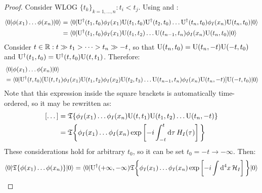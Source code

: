 \begin{proofbox}
  \begin{proof}
    Consider WLOG $ \{t_k\}_{k = 1,\dots,n} : t_i < t_j $. Using  and :
    \begin{equation*}
      \begin{split}
        \braket{0 | \phi(x_1) \dots \phi(x_n) | 0}
        & = \braket{0 | \mathrm{U}^\dagger(t_1,t_0) \phi_I(x_1) \mathrm{U}(t_1,t_0) \mathrm{U}^\dagger(t_2,t_0) \dots \mathrm{U}^\dagger(t_n,t_0) \phi_I(x_n) \mathrm{U}(t_n,t_0) | 0} \\
        & = \braket{0 | \mathrm{U}^\dagger(t_1,t_0) \phi_I(x_1) \mathrm{U}(t_1,t_2) \dots \mathrm{U}(t_{n-1},t_n) \phi_I(x_n) \mathrm{U}(t_n,t_0) | 0}
      \end{split}
    \end{equation*}
    Consider $ t \in \mathbb{R} : t \gg t_1 > \dots > t_n \gg -t $, so that $ \mathrm{U}(t_n,t_0) = \mathrm{U}(t_n,-t) \mathrm{U}(-t,t_0) $ and $ \mathrm{U}^\dagger(t_1,t_0) = \mathrm{U}^\dagger(t,t_0) \mathrm{U}(t,t_1) $. Therefore:
    \begin{equation*}
      \begin{split}
        & \braket{0 | \phi(x_1) \dots \phi(x_n) | 0} \\
        & = \braket{0 | \mathrm{U}^\dagger(t,t_0) [\mathrm{U}(t,t_1) \phi_I(x_1) \mathrm{U}(t_1,t_2) \phi_I(x_2) \mathrm{U}(t_2,t_3) \dots \mathrm{U}(t_{n-1},t_n) \phi_I(x_n) \mathrm{U}(t_n,-t)] \mathrm{U}(-t,t_0) | 0}
      \end{split}
    \end{equation*}
    Note that this expression inside the square brackets is automatically time-ordered, so it may be rewritten as:
    \begin{equation*}
      \begin{split}
        [\dots]
        & = \mathfrak{T}\{\phi_I(x_1) \dots \phi_I(x_n) \mathrm{U}(t,t_1) \mathrm{U}(t_1,t_2) \dots \mathrm{U}(t_n,-t)\} \\
        & = \mathfrak{T}\bigg\{ \phi_I(x_1) \dots \phi_I(x_n) \exp \left[ -i \int_{-t}^t \mathrm{d}\tau\, H_I(\tau) \right]\bigg\}
      \end{split}
    \end{equation*}
    These considerations hold for arbitrary $ t_0 $, so it can be set $ t_0 = -t \rightarrow -\infty $. Then:
    \begin{equation*}
      \braket{0 | \tempord\{\phi(x_1) \dots \phi(x_n)\} | 0} = \braket{0 | \tens{U}\dg(+\infty,-\infty) \tempord\bigg\{ \phi_I(x_1) \dots \phi_I(x_n) \exp \left[ -i \int \dd^4x\, \ham_I \right] \bigg\} | 0}

\end{equation*}
\end{proof}
\end{proofbox}
